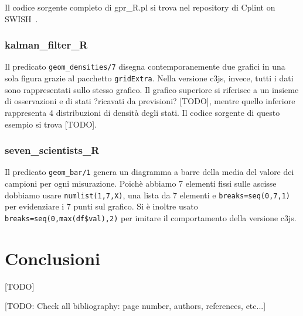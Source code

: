 \documentclass[10pt,titlepage,twoside,a4paper]{report}
\begin{document}
Il codice sorgente completo di gpr\_R.pl si trova nel repository di 
Cplint on SWISH~\cite{gprRpl}.

\subsection{kalman\_filter\_R}
Il predicato \texttt{geom\_densities/7} disegna contemporanemente
due grafici in una sola figura grazie al pacchetto
\texttt{gridExtra}\cite{gridExtra}. Nella versione c3js, invece, tutti i dati 
sono rappresentati sullo stesso grafico.
Il grafico superiore si riferisce a un insieme di osservazioni e di stati 
?ricavati da previsioni? [TODO], mentre quello inferiore rappresenta 4 
distribuzioni di densità degli stati. Il codice sorgente di questo esempio si 
trova [TODO].

\subsection{seven\_scientists\_R}
Il predicato \texttt{geom\_bar/1}  genera un diagramma a barre 
della media del valore dei campioni per ogni misurazione. Poichè 
abbiamo 7 elementi fissi sulle ascisse dobbiamo usare \texttt{numlist(1,7,X)}, 
una lista da 7 elementi e \texttt{breaks=seq(0,7,1)} per evidenziare i 7 
punti sul grafico. Si è inoltre usato \texttt{breaks=seq(0,max(df\$val),2)} 
per imitare il comportamento della versione c3js.





\chapter{Conclusioni}

[TODO]


[TODO: Check all bibliography: page number, authors, references, etc...]

\printbibliography
\end{document}
